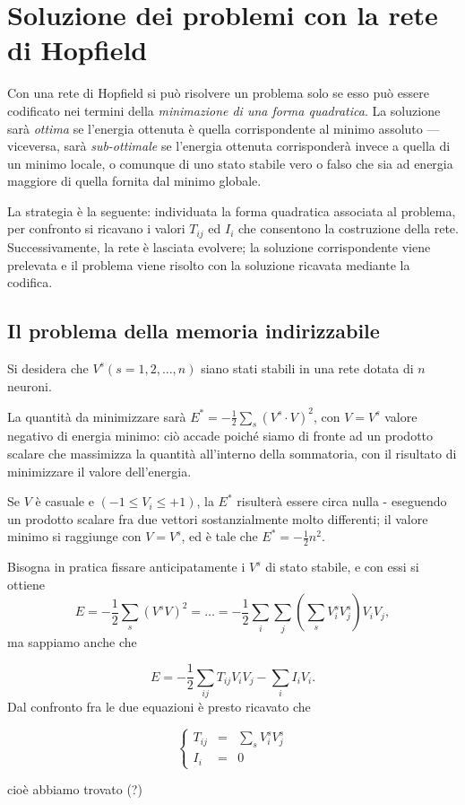 \documentclass[10pt]{book}
\begin{document}
\section{Soluzione dei problemi con la rete di Hopfield}

Con una rete di Hopfield si può risolvere un problema solo se esso può essere
codificato nei termini della \emph{minimazione di una forma quadratica}. La
soluzione sarà \emph{ottima} se l'energia ottenuta è quella corrispondente al
minimo assoluto \---- viceversa, sarà \emph{sub-ottimale} se l'energia ottenuta
corrisponderà invece a quella di un minimo locale, o comunque di uno stato
stabile vero o falso che sia ad energia maggiore di quella fornita dal minimo
globale.

La strategia è la seguente: individuata la forma quadratica associata al
problema, per confronto si ricavano i valori $T_{ij}$ ed $I_i$ che consentono
la costruzione della rete. Successivamente, la rete è lasciata evolvere; la
soluzione corrispondente viene prelevata e il problema viene risolto con la
soluzione ricavata mediante la codifica.

\subsection{Il problema della memoria indirizzabile}

Si desidera che $V^s(s=1,2,\dots, n)$ siano stati stabili in una rete dotata di
$n$ neuroni. 

La quantità da minimizzare sarà $E^* = -\frac 1 2 \sum_s (V^s\cdot
V)^2$, con $V=V^s$ valore negativo di energia minimo: ciò accade poiché siamo
di fronte ad un prodotto scalare che massimizza la quantità all'interno della
sommatoria, con il risultato di minimizzare il valore dell'energia. 

Se $V$ è
casuale e $(-1 \leq V_i \leq +1)$, la $E^*$ risulterà essere circa nulla \--
eseguendo un prodotto scalare fra due vettori sostanzialmente molto differenti;
il valore minimo si raggiunge con $V=V^s$, ed è tale che $E^* = -\frac 1 2
n^2$. 

Bisogna in pratica fissare anticipatamente i $V^s$ di stato stabile, e
con essi si ottiene $$ E = -\frac 1 2 \sum_s (V^s V)^2 = \dots = -\frac 1 2
\sum_i \sum_j (\sum_s V_i^s V_j^s)V_i V_j,$$ ma sappiamo anche che

$$E= -\frac 1 2 \sum_{ij} T_{ij}V_i V_j - \sum_i I_i V_i.$$ Dal confronto fra
le due equazioni è presto ricavato che 

$$
\left\{
    \begin{array}{lll}
        T_{ij} & = & \sum_s V_i^s V_j^s \\
        I_i & = & 0
    \end{array}
\right.
$$

cioè abbiamo trovato (?)
\end{document}
